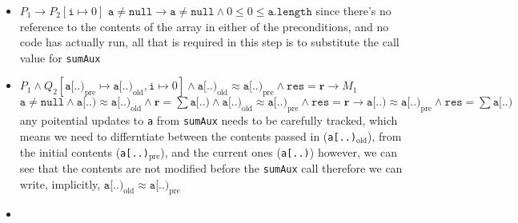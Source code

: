 \documentclass[a4paper, 12pt]{article}
\begin{document}
                \begin{itemize}
                    \itemsep0em
                    \item $P_1 \rightarrow P_2[\texttt{i} \mapsto 0]$
                        \subitem $\texttt{a} \neq \texttt{null} \rightarrow \texttt{a} \neq \texttt{null} \land 0 \leq 0 \leq \texttt{a.length}$
                        \subitem since there's no reference to the contents of the array in either of the preconditions, and no code has actually run, all that is required in this step is to substitute the call value for \texttt{sumAux}
                    \item $P_1 \land Q_2[\texttt{a[..)}_\text{pre} \mapsto \texttt{a[..)}_\text{old}, \texttt{i} \mapsto 0] \land \texttt{a[..)}_\text{old} \approx \texttt{a[..)}_\text{pre} \land \texttt{res} = \textbf{r} \rightarrow M_1$
                        \subitem $\texttt{a} \neq \texttt{null} \land \texttt{a[..)} \approx \texttt{a[..)}_\text{old} \land \textbf{r} = \sum \texttt{a[..)} \land \texttt{a[..)}_\text{old} \approx \texttt{a[..)}_\text{pre} \land \texttt{res} = \textbf{r} \rightarrow \texttt{a[..)} \approx \texttt{a[..)}_\text{pre} \land \texttt{res} = \sum \texttt{a[..)}$
                        \subitem any poitential updates to \texttt{a} from \texttt{sumAux} needs to be carefully tracked, which means we need to differntiate between the contents passed in (\texttt{a[..)}$_\text{old}$), from the initial contents (\texttt{a[..)}$_\text{pre}$), and the current ones (\texttt{a[..)})
                        \subitem however, we can see that the contents are not modified before the \texttt{sumAux} call therefore we can write, implicitly, $\texttt{a[..)}_\text{old} \approx \texttt{a[..)}_\text{pre}$
                    \item 
                \end{itemize}
\end{document}

